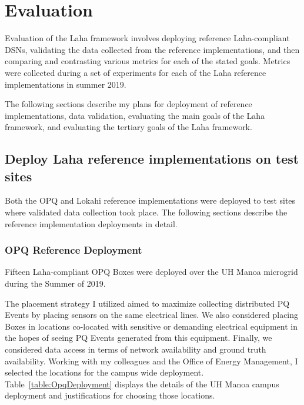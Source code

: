 \chapter{Evaluation}\label{ch:evaluation}
Evaluation of the Laha framework involves deploying reference Laha-compliant DSNs, validating the data collected from the reference implementations, and then comparing and contrasting various metrics for each of the stated goals. Metrics were collected during a set of experiments for each of the Laha reference implementations in summer 2019.

The following sections describe my plans for deployment of reference implementations, data validation, evaluating the main goals of the Laha framework, and evaluating the tertiary goals of the Laha framework.

\section{Deploy Laha reference implementations on test sites}\label{sec:deploy-laha-reference-implementations-on-test-sites}
Both the OPQ and Lokahi reference implementations were deployed to test sites where validated data collection took place. The following sections describe the reference implementation deployments in detail.

\subsection{OPQ Reference Deployment}\label{subsec:opq-reference-deployment}
Fifteen Laha-compliant OPQ Boxes were deployed over the UH Manoa microgrid during the Summer of 2019.

The placement strategy I utilized aimed to maximize collecting distributed PQ Events by placing sensors on the same electrical lines. We also considered placing Boxes in locations co-located with sensitive or demanding electrical equipment in the hopes of seeing PQ Events generated from this equipment. Finally, we considered data access in terms of network availability and ground truth availability. Working with my colleagues and the Office of Energy Management, I selected the locations for the campus wide deployment. Table~\ref{table:OpqDeployment} displays the details of the UH Manoa campus deployment and justifications for choosing those locations.

